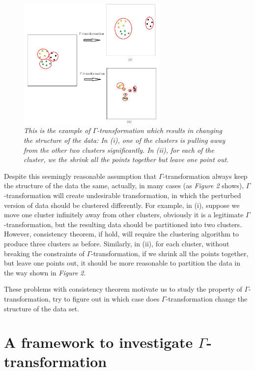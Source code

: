 \documentclass{uonmathreport}
\begin{document}
\begin{figure}[H]
 \begin{center}
   \includegraphics[width=0.65\textwidth]{Paper_figure_2.png}
 \end{center}
 \caption{\textit{This is the example of $\Gamma$-transformation which results in changing the structure of the data: In (i), one of the clusters is pulling away from the other two clusters significantly. In (ii), for each of the cluster, we the shrink all the points together but leave one point out.}}
 \label{fig:bsd}
\end{figure}

Despite this seemingly reasonable assumption that $\Gamma$-transformation always keep the structure of the data the same, actually, in many cases (as \textit{Figure 2} shows), $\Gamma$-transformation will create undesirable transformation, in which the perturbed version of data should be clustered differently. For example, in (i), suppose we move one cluster infinitely away from other clusters, obviously it is a legitimate $\Gamma$-transformation, but the resulting data should be partitioned into  two clusters. However, consistency theorem, if hold, will require the clustering algorithm to produce three clusters as before. Similarly, in (ii), for each cluster, without breaking the constraints of $\Gamma$-transformation, if we shrink all the points together, but leave one points out, it should be more reasonable to partition the data in the way shown in \textit{Figure 2}.

These problems with consistency theorem motivate us to study the property of $\Gamma$-transformation, try to figure out in which case does $\Gamma$-transformation change the structure of the data set.
\section{A framework to investigate $\Gamma$-transformation} \label{sec:framework}
\end{document}
